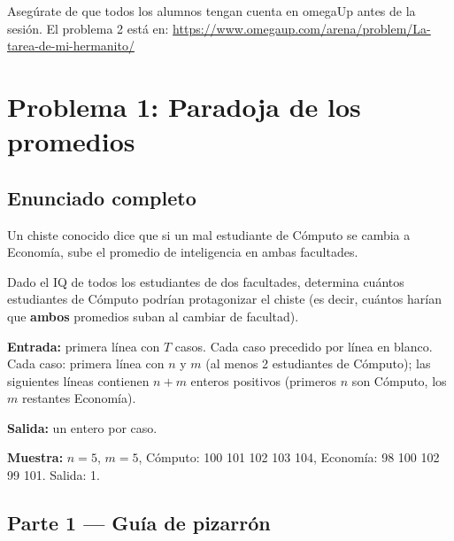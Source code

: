 \documentclass[12pt, oneside]{article}
\begin{document}
\begin{notaprofesor}
  Asegúrate de que todos los alumnos tengan cuenta en omegaUp antes de
  la sesión.  El problema 2 está en:
  \url{https://www.omegaup.com/arena/problem/La-tarea-de-mi-hermanito/}
\end{notaprofesor}

\newpage

\section{Problema 1: Paradoja de los promedios}

\subsection{Enunciado completo}

Un chiste conocido dice que si un mal estudiante de Cómputo se cambia a
Economía, sube el promedio de inteligencia en ambas facultades.

Dado el IQ de todos los estudiantes de dos facultades, determina cuántos
estudiantes de Cómputo podrían protagonizar el chiste (es decir, cuántos
harían que \textbf{ambos} promedios suban al cambiar de facultad).

\textbf{Entrada:} primera línea con $T$ casos.  Cada caso precedido por
línea en blanco.  Cada caso: primera línea con $n$ y $m$ (al menos
2 estudiantes de Cómputo); las siguientes líneas contienen $n + m$
enteros positivos (primeros $n$ son Cómputo, los $m$ restantes Economía).

\textbf{Salida:} un entero por caso.

\textbf{Muestra:} $n=5$, $m=5$, Cómputo: 100 101 102 103 104,
Economía: 98 100 102 99 101.  Salida: 1.

\subsection{Parte 1 — Guía de pizarrón}
\end{document}
